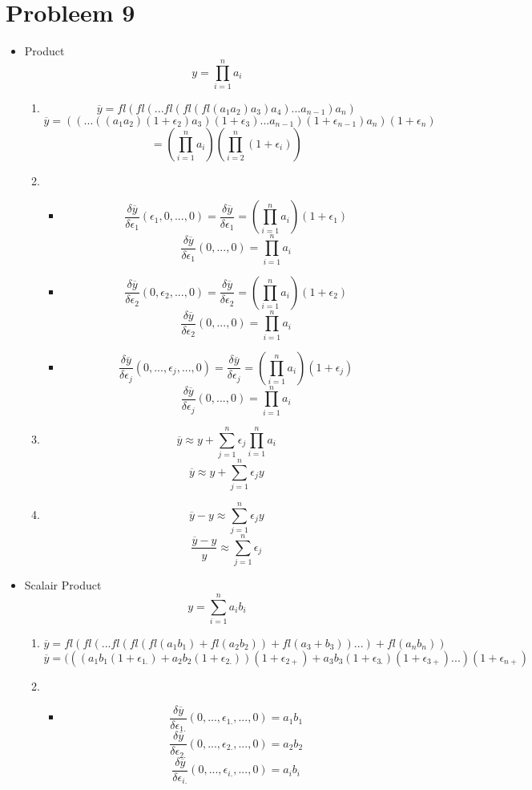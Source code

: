 \documentclass[12pt,a4paper]{article}
\begin{document}
\section{Probleem 9}
\begin{itemize}
\item Product\\
\[
y = \prod_{i=1}^{n}a_i
\]
\begin{enumerate}
\item
\[
\overline{y} = fl(fl(...fl(fl(fl(a_1 a_2) a_3) a_4)... a_{n-1}) a_{n})
\]
\[
\overline{y} = ((...((a_1 a_2)(1+\epsilon_2) a_3)(1+\epsilon_3)...a_{n-1})(1+\epsilon_{n-1}) a_n)(1+\epsilon_n)
\]
\[
= \left(\prod_{i=1}^{n} a_{i} \right) \left( \prod_{i=2}^n(1+\epsilon_i) \right)
\]
\item
\begin{itemize}
\item
\[
\frac{\delta\overline{y}}{\delta\epsilon_1}(\epsilon_1,0,...,0)
= \frac{\delta\overline{y}}{\delta\epsilon_1}
= \left(\prod_{i=1}^{n} a_{i} \right) (1+\epsilon_1)
\]
\[
\frac{\delta\overline{y}}{\delta\epsilon_1}(0,...,0)
= \prod_{i=1}^{n} a_{i}
\]
\item
\[
\frac{\delta\overline{y}}{\delta\epsilon_2}(0,\epsilon_2,...,0)
= \frac{\delta\overline{y}}{\delta\epsilon_2}
= \left(\prod_{i=1}^{n} a_{i} \right) (1+\epsilon_2)
\]
\[
\frac{\delta\overline{y}}{\delta\epsilon_2}(0,...,0)
= \prod_{i=1}^{n} a_{i}
\]
\item
\[
\frac{\delta\overline{y}}{\delta\epsilon_j}(0,...,\epsilon_j,...,0)
= \frac{\delta\overline{y}}{\delta\epsilon_j}
= \left(\prod_{i=1}^{n} a_{i} \right) (1+\epsilon_j)
\]
\[
\frac{\delta\overline{y}}{\delta\epsilon_j}(0,...,0)
= \prod_{i=1}^{n} a_{i}
\]
\end{itemize}

\item
\[
\overline{y} \approx y
+ \sum_{j=1}^{n} \epsilon_j \prod_{i=1}^{n} a_{i}
\]
\[
\overline{y} \approx y
+ \sum_{j=1}^{n} \epsilon_j y
\]

\item
\[
\overline{y} - y
\approx
\sum_{j=1}^{n} \epsilon_j y
\]
\[
\frac{\overline{y} - y}{y}
\approx
\sum_{j=1}^{n} \epsilon_j
\]

\end{enumerate}

\item Scalair Product\\
\[
y = \sum_{i=1}^{n}a_{i}b_{i}
\]
\begin{enumerate}
\item
\[
\overline{y} = fl(fl(...fl(fl(fl(a_1b_1)+fl(a_2b_2))+fl(a_3+b_3))...)+fl(a_nb_n))
\]
\[
\overline{y} = (((a_1b_1(1+\epsilon_{1.})+a_2b_2(1+\epsilon_{2.}))(1+\epsilon_{2+}) + a_3b_3(1+\epsilon_{3.})(1+\epsilon_{3+})...)(1+\epsilon_{n+})
\]
\item
\begin{itemize}
\item
\[
\frac{\delta\overline{y}}{\delta\epsilon_{1.}}(0,...,\epsilon_{1.},...,0)
= a_1b_1
\]
\[
\frac{\delta\overline{y}}{\delta\epsilon_{2.}}(0,...,\epsilon_{2.},...,0)
= a_2b_2
\]
\[
\frac{\delta\overline{y}}{\delta\epsilon_{i.}}(0,...,\epsilon_{i.},...,0)
= a_ib_i
\]


\end{itemize}
\end{enumerate}
\end{itemize}
\end{document}
